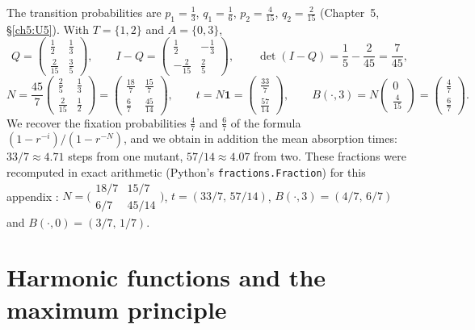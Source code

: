 \begin{example}[Moran, $N=3$, $r=2$: the full computation]\label{appB:ex:moran3}
The transition probabilities are $p_1=\frac13$, $q_1=\frac16$, $p_2=\frac4{15}$, $q_2=\frac2{15}$ (Chapter~5,
§\ref{ch5:U5}). With $T=\{1,2\}$ and $A=\{0,3\}$,
\[Q=\begin{pmatrix}\frac12&\frac13\\[2pt]\frac2{15}&\frac35\end{pmatrix},\qquad
I-Q=\begin{pmatrix}\frac12&-\frac13\\[2pt]-\frac2{15}&\frac25\end{pmatrix},\qquad\det(I-Q)=\frac15-\frac2{45}=\frac7{45},\]
\[N=\frac{45}7\begin{pmatrix}\frac25&\frac13\\[2pt]\frac2{15}&\frac12\end{pmatrix}=\begin{pmatrix}\frac{18}7&\frac{15}7\\[2pt]
\frac67&\frac{45}{14}\end{pmatrix},\qquad t=N\mathbf 1=\begin{pmatrix}\frac{33}7\\[2pt]\frac{57}{14}\end{pmatrix},\qquad
B(\cdot,3)=N\begin{pmatrix}0\\ \frac4{15}\end{pmatrix}=\begin{pmatrix}\frac47\\[2pt]\frac67\end{pmatrix}.\]
We recover the fixation probabilities $\frac47$ and $\frac67$ of the formula $(1-r^{-i})/(1-r^{-N})$, and we obtain
in addition the mean absorption times: $33/7\approx4.71$ steps from one mutant, $57/14\approx4.07$ from two. These
fractions were recomputed in exact arithmetic (Python's \texttt{fractions.Fraction}) for this appendix
\tierX{}: $N=\bigl(\begin{smallmatrix}18/7&15/7\\6/7&45/14\end{smallmatrix}\bigr)$, $t=(33/7,\,57/14)$,
$B(\cdot,3)=(4/7,\,6/7)$ and $B(\cdot,0)=(3/7,\,1/7)$.
\end{example}

\section{Harmonic functions and the maximum principle}\label{appB:sec:harm}

